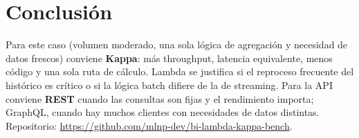 \documentclass[conference,a4paper]{IEEEtran}
\begin{document}
\section{Conclusión}
Para este caso (volumen moderado, una sola lógica de agregación y necesidad de datos frescos)
conviene \textbf{Kappa}: más throughput, latencia equivalente, menos código y una sola ruta de
cálculo. Lambda se justifica si el reproceso frecuente del histórico es crítico o si la lógica batch
difiere de la de streaming. Para la API conviene \textbf{REST} cuando las consultas son fijas y el
rendimiento importa; GraphQL, cuando hay muchos clientes con necesidades de datos distintas.
Repositorio: \url{https://github.com/mlnp-dev/bi-lambda-kappa-bench}.



\end{document}
